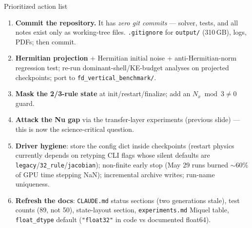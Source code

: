 \documentclass[aspectratio=169,10pt]{beamer}
\newcommand{\file}[1]{\textcolor{blue!60!black}{\texttt{#1}}}
\begin{document}
\begin{frame}{Prioritized action list}
  \begin{enumerate}
    \item \textbf{Commit the repository.} It has \emph{zero git commits} --- solver,
      tests, and all notes exist only as working-tree files.
      \texttt{.gitignore} for \file{output/} (310\,GB), logs, PDFs; then commit.
    \item \textbf{Hermitian projection} + Hermitian initial noise + anti-Hermitian-norm
      regression test; re-run dominant-shell/KE-budget analyses on projected
      checkpoints; port to \file{fd\_vertical\_benchmark/}.
    \item \textbf{Mask the 2/3-rule state} at init/restart/finalize; add an
      $N_x \bmod 3 \ne 0$ guard.
    \item \textbf{Attack the Nu gap} via the transfer-layer experiments (previous
      slide) --- this is now the science-critical question.
    \item \textbf{Driver hygiene}: store the config dict inside checkpoints
      (restart physics currently depends on retyping CLI flags whose silent defaults
      are \texttt{legacy}/\texttt{32\_rule}/\texttt{jacobian}); non-finite early
      stop (May 29 runs burned $\sim$60\% of GPU time stepping NaN); incremental
      archive writes; run-name uniqueness.
    \item \textbf{Refresh the docs}: \file{CLAUDE.md} status sections (two
      generations stale), test counts (89, not 50), state-layout section,
      \file{experiments.md} Miquel table, \texttt{float\_dtype} default
      (\texttt{"float32"} in code vs documented float64).
  \end{enumerate}
\end{frame}
\end{document}
